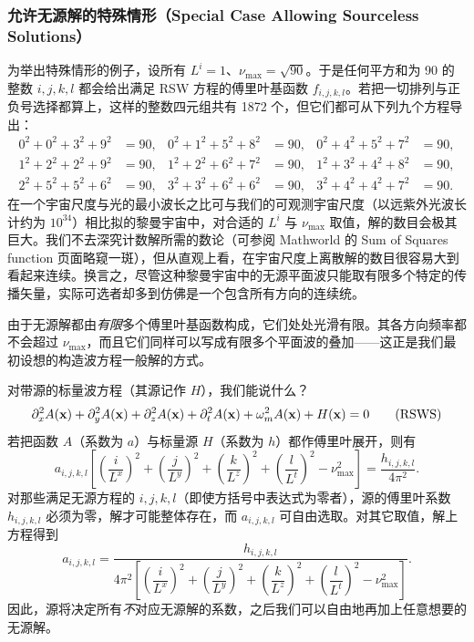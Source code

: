 \subsubsection{允许无源解的特殊情形（Special Case Allowing Sourceless Solutions）}

为举出特殊情形的例子，设所有 $L^{i}=1$、$\nu_{\max}=\sqrt{90}$。于是任何平方和为 90 的整数 $i,j,k,l$ 都会给出满足 RSW 方程的傅里叶基函数 $f_{i,j,k,l}$。若把一切排列与正负号选择都算上，这样的整数四元组共有 1872 个，但它们都可从下列九个方程导出：
\begin{align*}
0^{2}+0^{2}+3^{2}+9^{2} &= 90, & 0^{2}+1^{2}+5^{2}+8^{2} &= 90, & 0^{2}+4^{2}+5^{2}+7^{2} &= 90,\\
1^{2}+2^{2}+2^{2}+9^{2} &= 90, & 1^{2}+2^{2}+6^{2}+7^{2} &= 90, & 1^{2}+3^{2}+4^{2}+8^{2} &= 90,\\
2^{2}+5^{2}+5^{2}+6^{2} &= 90, & 3^{2}+3^{2}+6^{2}+6^{2} &= 90, & 3^{2}+4^{2}+4^{2}+7^{2} &= 90.
\end{align*}
在一个宇宙尺度与光的最小波长之比可与我们的可观测宇宙尺度（以远紫外光波长计约为 $10^{34}$）相比拟的黎曼宇宙中，对合适的 $L^{i}$ 与 $\nu_{\max}$ 取值，解的数目会极其巨大。我们不去深究计数解所需的数论（可参阅 Mathworld 的 Sum of Squares function 页面略窥一斑），但从直观上看，在宇宙尺度上离散解的数目很容易大到看起来连续。换言之，尽管这种黎曼宇宙中的无源平面波只能取有限多个特定的传播矢量，实际可选者却多到仿佛是一个包含所有方向的连续统。

由于无源解都由\emph{有限}多个傅里叶基函数构成，它们处处光滑有限。其各方向频率都不会超过 $\nu_{\max}$，而且它们同样可以写成有限多个平面波的叠加——这正是我们最初设想的构造波方程一般解的方式。

对带源的标量波方程（其源记作 $H$），我们能说什么？
\begin{equation}
\partial_{x}^{2}A(\mathbf{x}) + \partial_{y}^{2}A(\mathbf{x}) + \partial_{z}^{2}A(\mathbf{x}) + \partial_{t}^{2}A(\mathbf{x}) + \omega_m^{2} A(\mathbf{x}) + H(\mathbf{x}) = 0 \tag{RSWS}
\end{equation}
若把函数 $A$（系数为 $a$）与标量源 $H$（系数为 $h$）都作傅里叶展开，则有
\begin{equation}
a_{i,j,k,l}\left[\left(\frac{i}{L^{x}}\right)^{2}+\left(\frac{j}{L^{y}}\right)^{2}+\left(\frac{k}{L^{z}}\right)^{2}+\left(\frac{l}{L^{t}}\right)^{2}-\nu_{\max}^{2}\right] = \frac{h_{i,j,k,l}}{4\pi^{2}}.
\end{equation}
对那些满足无源方程的 $i,j,k,l$（即使方括号中表达式为零者），源的傅里叶系数 $h_{i,j,k,l}$ 必须为零，解才可能整体存在，而 $a_{i,j,k,l}$ 可自由选取。对其它取值，解上方程得到
\begin{equation}
a_{i,j,k,l} = \frac{h_{i,j,k,l}}{4\pi^{2}\left[\left(\dfrac{i}{L^{x}}\right)^{2}+\left(\dfrac{j}{L^{y}}\right)^{2}+\left(\dfrac{k}{L^{z}}\right)^{2}+\left(\dfrac{l}{L^{t}}\right)^{2}-\nu_{\max}^{2}\right]}.
\end{equation}
因此，源将决定所有\emph{不}对应无源解的系数，之后我们可以自由地再加上任意想要的无源解。

